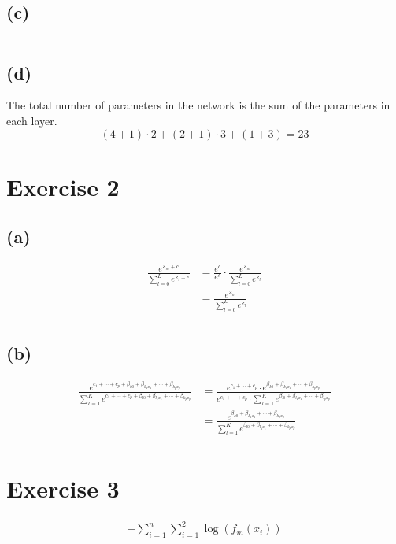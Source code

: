 \documentclass{article}
\begin{document}
\subsection*{(c)}
\inputminted{r}{src/q1.R}

\subsection*{(d)}
The total number of parameters in the network is the sum of the parameters in each layer.
\[(4+1)\cdot 2 + (2+1)\cdot 3 + (1+3) = 23\]

\section*{Exercise 2}
\subsection*{(a)}

\begin{align*}
\frac{e^{Z_m+c}}{\sum_{l=0}^{L}e^{Z_l+c}} 
&= \frac{e^c}{e^c} \cdot \frac{e^{Z_m}}{\sum_{l=0}^{L} e^{Z_l}} \\
&= \frac{e^{Z_m}}{\sum_{l=0}^{L} e^{Z_l}} \\
\end{align*}

\subsection*{(b)}
\begin{align*}
\frac{e^{c_1 + \cdots + c_p + \beta_{k0} +\beta_{k_1x_1} + \cdots + \beta_{k_p x_p}}}{\sum_{l=1}^K e^{c_1 + \cdots + c_p + \beta_{l0} +\beta_{l_1x_1} + \cdots + \beta_{k_p x_p}}} 
&= \frac{e^{c_1 + \cdots + c_p} \cdot e^{\beta_{k0} +\beta_{k_1x_1} + \cdots + \beta_{k_p x_p}}}{e^{c_1 + \cdots + c_p}\cdot \sum_{l=1}^K  e^{\beta_{l0} +\beta_{l_1x_1} + \cdots + \beta_{l_p x_p}}} \\
&= \frac{e^{\beta_{k0} +\beta_{k_1x_1} + \cdots + \beta_{k_p x_p}}}{\sum_{l=1}^K e^{\beta_{l0} +\beta_{l_1x_1} + \cdots + \beta_{k_p x_p}}} \\
\end{align*}

\section*{Exercise 3}

\begin{align*}
-\sum_{i=1}^{n}\sum_{i=1}^{2}\log(f_m(x_i))
\end{align*}
\end{document}
